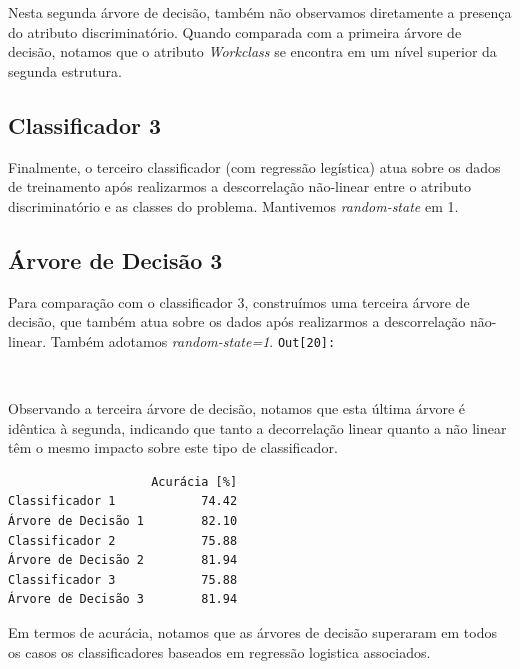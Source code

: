 \documentclass[11pt]{article}
\begin{document}
    Nesta segunda árvore de decisão, também não observamos diretamente a
presença do atributo discriminatório. Quando comparada com a primeira
árvore de decisão, notamos que o atributo \emph{Workclass} se encontra
em um nível superior da segunda estrutura.

    \subsection{Classificador 3}\label{classificador-3}

Finalmente, o terceiro classificador (com regressão legística) atua
sobre os dados de treinamento após realizarmos a descorrelação
não-linear entre o atributo discriminatório e as classes do problema.
Mantivemos \emph{random-state} em 1.

    \subsection{Árvore de Decisão 3}\label{uxe1rvore-de-decisuxe3o-3}

Para comparação com o classificador 3, construímos uma terceira árvore
de decisão, que também atua sobre os dados após realizarmos a
descorrelação não-linear. Também adotamos \emph{random-state=1}.
\texttt{\color{outcolor}Out[{\color{outcolor}20}]:}
    
    \begin{center}
    \end{center}
    { \hspace*{\fill} \\}
    

    Observando a terceira árvore de decisão, notamos que esta última árvore
é idêntica à segunda, indicando que tanto a decorrelação linear quanto a
não linear têm o mesmo impacto sobre este tipo de classificador.

    
    \begin{verbatim}
                    Acurácia [%]
Classificador 1            74.42
Árvore de Decisão 1        82.10
Classificador 2            75.88
Árvore de Decisão 2        81.94
Classificador 3            75.88
Árvore de Decisão 3        81.94
    \end{verbatim}

    
    Em termos de acurácia, notamos que as árvores de decisão superaram em
todos os casos os classificadores baseados em regressão logistica
associados.
\end{document}
